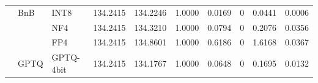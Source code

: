 \begin{table}[t]
{\begin{tabular}{ll l rrrrrrr}
 & BnB & INT8 & 134.2415 & 134.2246 & 1.0000 & 0.0169 & \cellcolor{cyan!10}$0$ & 0.0441 & 0.0006 \\
 &  & NF4 & 134.2415 & 134.3210 & 1.0000 & 0.0794 & \cellcolor{cyan!10}$0$ & 0.2076 & 0.0356 \\
 &  & FP4 & 134.2415 & 134.8601 & 1.0000 & 0.6186 & \cellcolor{cyan!10}$0$ & 1.6168 & 0.0367 \\
 & GPTQ & GPTQ-4bit & 134.2415 & 134.1767 & 1.0000 & 0.0648 & \cellcolor{cyan!10}$0$ & 0.1695 & 0.0132 \\
\bottomrule
\end{tabular}}
\end{table}
